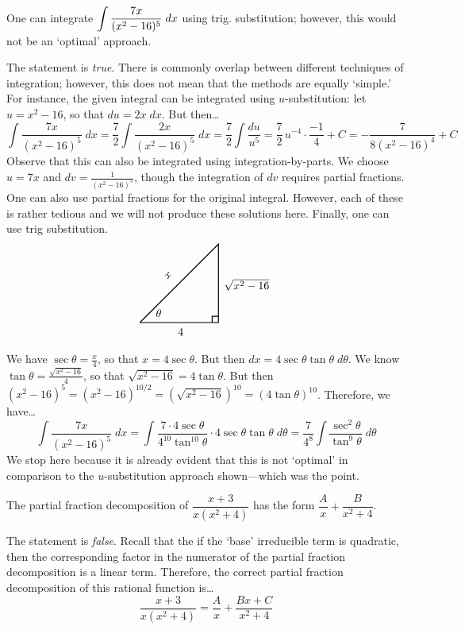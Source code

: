 \documentclass[11pt,letterpaper]{article}
\begin{document}
 One can integrate $\displaystyle \int \dfrac{7x}{(x^2 - 16)^5} \;dx$ using trig. substitution; however, this would not be an `optimal' approach. \pspace

\sol The statement is \textit{true}. There is commonly overlap between different techniques of integration; however, this does not mean that the methods are equally `simple.' For instance, the given integral can be integrated using $u$-substitution: let $u= x^2 - 16$, so that $du= 2x \;dx$. But then\dots
	\[
	\int \dfrac{7x}{(x^2 - 16)^5} \;dx= \dfrac{7}{2} \int \dfrac{2x}{(x^2 - 16)^5} \;dx= \dfrac{7}{2} \int \dfrac{du}{u^5}= \dfrac{7}{2}\, u^{-4} \cdot \dfrac{-1}{4} + C= -\dfrac{7}{8(x^2 - 16)^4} + C
	\]
Observe that this can also be integrated using integration-by-parts. We choose $u= 7x$ and $dv= \tfrac{1}{(x^2 - 16)^5}$, though the integration of $dv$ requires partial fractions. One can also use partial fractions for the original integral. However, each of these is rather tedious and we will not produce these solutions here. Finally, one can use trig substitution. 
	\[
	\begin{tikzpicture}
	\draw[line width=0.03cm] (0,0) -- (2.5,0) -- (2.5,2.5) -- (0,0);
	\draw[line width=0.03cm] (2.3,0) -- (2.3,0.2) -- (2.5,0.2);
	\node at (0.6,0.3) {$\theta$};
	\node at (1.3,-0.3) {$4$};
	\node at (3.4,1.2) {$\sqrt{x^2 - 16}$};
	\node[rotate = 45] at (0.9,1.5) {$x$};
	\end{tikzpicture}
	\]
We have $\sec \theta= \tfrac{x}{4}$, so that $x= 4 \sec \theta$. But then $dx= 4 \sec \theta \tan \theta \;d\theta$. We know $\tan \theta= \tfrac{\sqrt{x^2 - 16}}{4}$, so that $\sqrt{x^2 - 16}= 4 \tan \theta$. But then $(x^2 - 16)^5= (x^2 - 16)^{10/2}= (\sqrt{x^2 - 16})^{10}= ( 4 \tan \theta)^{10}$. Therefore, we have\dots
	\[
	\int \dfrac{7x}{(x^2 - 16)^5} \;dx= \int \dfrac{7 \cdot 4 \sec \theta}{4^{10} \tan^{10} \theta} \cdot 4 \sec \theta \tan \theta \;d\theta= \dfrac{7}{4^8} \int \dfrac{\sec^2 \theta}{\tan^9 \theta} \;d\theta
	\]
We stop here because it is already evident that this is not `optimal' in comparison to the $u$-substitution approach shown---which was the point. \par\vspace{1.3cm}



 The partial fraction decomposition of $\dfrac{x + 3}{x(x^2 + 4)}$ has the form $\dfrac{A}{x} + \dfrac{B}{x^2 + 4}$. \pspace

\sol The statement is \textit{false}. Recall that the if the `base' irreducible term is quadratic, then the corresponding factor in the numerator of the partial fraction decomposition is a linear term. Therefore, the correct partial fraction decomposition of this rational function is\dots
	\[
	\dfrac{x + 3}{x(x^2 + 4)}= \dfrac{A}{x} + \dfrac{Bx + C}{x^2 + 4}
	\]
\end{document}
